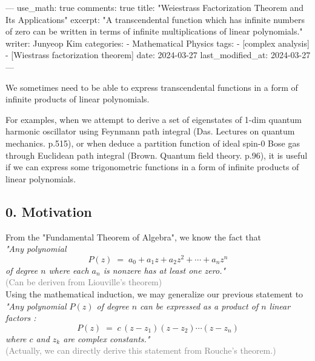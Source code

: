 ---
use_math: true
comments: true
title:  "Weiestrass Factorization Theorem and Its Applications"
excerpt: "A transcendental function which has infinite numbers of zero can be written in terms of infinite multiplications of linear polynomials."
writer: Junyeop Kim
categories:
  - Mathematical Physics
tags:
  - [complex analysis]
  - [Wiestrass factorization theorem]
date: 2024-03-27
last_modified_at: 2024-03-27
---

\usepackage{geometry}
\geometry{ a4paper, left=20mm, right=20mm, top=13mm, bottom=13mm }
\usepackage{amsmath}
\usepackage{xcolor}
\usepackage{MnSymbol}%
\usepackage{wasysym}%

\setlength{\parindent}{0pt}



\quad We sometimes need to be able to express transcendental functions in a form of infinite products of linear polynomials.\

\quad For examples, when we attempt to derive a set of eigenstates of 1-dim quantum harmonic oscillator using Feynmann path integral (Das. Lectures on quantum mechanics. p.515), or when deduce a partition function of ideal spin-0 Bose gas through Euclidean path integral (Brown. Quantum field theory. p.96), it is useful if we can express some trigonometric functions in a form of infinite products of linear polynomials.\\


\subsection*{0. Motivation}
\vspace{2mm}
From the "Fundamental Theorem of Algebra", we know the fact that\\
 
\textit{"Any polynomial $$ P(z) \;=\; a_0 + a_1 z + a_2 z^2 + \cdots + a_n z^n $$ of degree $n$ where each $a_n$ is nonzere has at least one zero."}\\
\textcolor{gray}{(Can be deriven from  Liouville's theorem)}\\

Using the mathematical induction, we may generalize our previous statement to\\

\textit{"Any polynomial $P(z)$ of degree $n$ can be expressed as a product of $n$ linear factors : $$ P(z) \;=\; c\, (z-z_1)(z-z_2)\cdots (z-z_n) $$ where $c$ and $z_k$ are complex constants."}\\
\textcolor{gray}{(Actually, we can directly derive this statement from Rouche's theorem.)}\\
 
